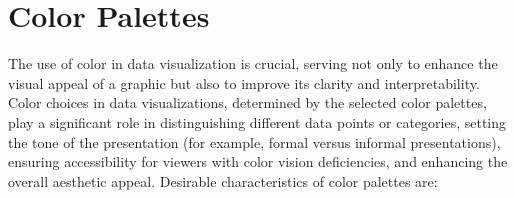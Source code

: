 
\section{Color Palettes}

The use of color in data visualization is crucial, serving not only to enhance the visual appeal of a graphic but also to improve its clarity and interpretability. Color choices in data visualizations, determined by the selected color palettes, play a significant role in distinguishing different data points or categories, setting the tone of the presentation (for example, formal versus informal presentations), ensuring accessibility for viewers with color vision deficiencies, and enhancing the overall aesthetic appeal. Desirable characteristics of color palettes are:

